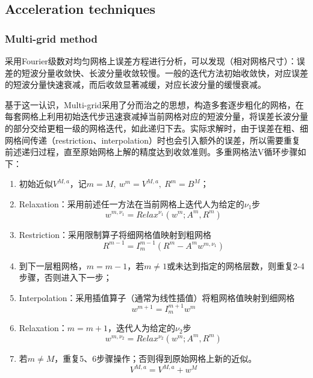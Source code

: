\documentclass[11pt]{article}
\begin{document}
\subsection{Acceleration techniques}
\subsubsection{Multi-grid method}
采用Fourier级数对均匀网格上误差方程进行分析，可以发现（相对网格尺寸）：误差的短波分量收敛快、长波分量收敛较慢。一般的迭代方法初始收敛快，对应误差的短波分量快速衰减，而后收敛显著减缓，对应长波分量的缓慢衰减。

基于这一认识，Multi-grid采用了分而治之的思想，构造多套逐步粗化的网格，在每套网格上利用初始迭代步迅速衰减掉当前网格对应的短波分量，将误差长波分量的部分交给更粗一级的网格迭代，如此递归下去。实际求解时，由于误差在粗、细网格间传递（restriction、interpolation）时也会引入额外的误差，所以需要重复前述递归过程，直至原始网格上解的精度达到收敛准则。多重网格法V循环步骤如下：
\begin{enumerate}
	\item 初始近似$V^{M,a}$，记$m=M,\ w^m=V^{M,a},\ R^m=B^M$；
	\item Relaxation：采用前述任一方法在当前网格上迭代人为给定的$\nu_1$步
	      \begin{equation}
		      w^{m,\nu_1}=Relax^{\nu_1}\left(w^m;A^m,R^m\right)
	      \end{equation}
	\item Restriction：采用限制算子将细网格值映射到粗网格
	      \begin{equation}
		      R^{m-1}=I_m^{m-1}\left(R^m-A^mw^{m,\nu_1}\right)
	      \end{equation}
	\item 到下一层粗网格，$m=m-1$，若$m\neq1$或未达到指定的网格层数，则重复2-4步骤，否则进入下一步；
	\item Interpolation：采用插值算子（通常为线性插值）将粗网格值映射到细网格
	      \begin{equation}
		      w^{m+1}=I_m^{m+1}w^m
	      \end{equation}
	\item Relaxation：$m=m+1$，迭代人为给定的$\nu_2$步
	      \begin{equation}
		      w^{m,\nu_2}=Relax^{\nu_2}\left(w^m;A^m,R^m\right)
	      \end{equation}
	\item 若$m\neq M$，重复5、6步骤操作；否则得到原始网格上新的近似。
	      \begin{equation}
		      V^{M,a}=V^{M,a}+w^M
	      \end{equation}
\end{enumerate}
\end{document}
